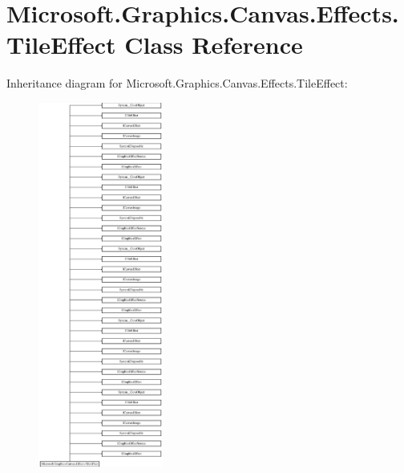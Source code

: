\hypertarget{class_microsoft_1_1_graphics_1_1_canvas_1_1_effects_1_1_tile_effect}{}\section{Microsoft.\+Graphics.\+Canvas.\+Effects.\+Tile\+Effect Class Reference}
\label{class_microsoft_1_1_graphics_1_1_canvas_1_1_effects_1_1_tile_effect}
Inheritance diagram for Microsoft.\+Graphics.\+Canvas.\+Effects.\+Tile\+Effect\+:\begin{figure}[H]
\begin{center}
\leavevmode
\includegraphics[height=12.000000cm]{class_microsoft_1_1_graphics_1_1_canvas_1_1_effects_1_1_tile_effect}
\end{center}
\end{figure}
